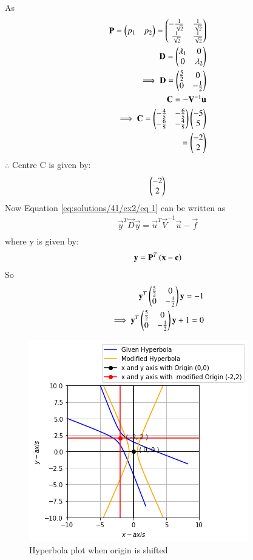 As
\begin{align}
  \mathbf{P}=\begin{pmatrix}p_1&p_2\end{pmatrix}= \begin{pmatrix}-\frac{1}{\sqrt{2}}&\frac{1}{\sqrt{2}}\\\frac{1}{\sqrt{2}}& \frac{1}{\sqrt{2}}\end{pmatrix}\\
   \mathbf{D}=\begin{pmatrix}\lambda_1&0\\0&\lambda_2\end{pmatrix}\\
   \implies 
   \mathbf{D}=\begin{pmatrix}\frac{5}{2}&0\\0&-\frac{1}{2}\end{pmatrix} \label{eq:solutions/41/ex2/eq 6}\\
    \mathbf{C}=-\mathbf{V}^{-1}\mathbf{u}\\
    \implies\mathbf{C} =\begin{pmatrix}-\frac{4}{5}&-\frac{6}{5}\\-\frac{6}{5}&-\frac{4}{5}\end{pmatrix} \begin{pmatrix}-5\\ 5\end{pmatrix}\\
   = \begin{pmatrix}-2\\2\end{pmatrix}
\end{align}
$\therefore$ Centre C is given by: 
\begin{align}
  \begin{pmatrix}-2\\2\end{pmatrix}
 \end{align}
 Now Equation \eqref{eq:solutions/41/ex2/eq 1} can be written as
\begin{align}
    \vec{y}^T\vec{D}\vec{y}=\vec{u}^T \vec {V}^{-1}\vec {u}-\vec {f}\\
\end{align}
where y is given by:
\begin{align}
     \mathbf{y}= \mathbf{P}^T\left(\mathbf{x}-\mathbf{c}\right)
\end{align}
So 
\begin{align}
   \mathbf{y}^T\begin{pmatrix}\frac{5}{2}&0\\0&-\frac{1}{2}\end{pmatrix}\mathbf{y}=-1\\
   \implies \mathbf{y}^T\begin{pmatrix}\frac{5}{2}&0\\0&-\frac{1}{2}\end{pmatrix}\mathbf{y}+1=0
\end{align}
\begin{figure}[ht!]
	\centering
	\includegraphics[width=\columnwidth]{./solutions/41/ex2/hyberbola.png}
	\caption{Hyperbola plot when origin is shifted}
	\label{eq:solutions/41/ex2/myfig}
\end{figure}
